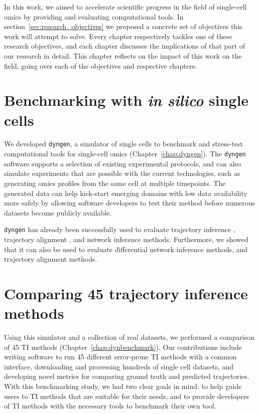 

In this work, we aimed to accelerate scientific progress in the field of single-cell omics by providing and evaluating computational tools. In section~\ref{sec:research_objectives} we proposed a concrete set of objectives this work will attempt to solve. Every chapter respectively tackles one of these research objectives, and each chapter discusses the implications of that part of our research in detail. This chapter reflects on the impact of this work on the field, going over each of the objectives and respective chapters. 

\section{Benchmarking with \textit{in silico} single cells}

We developed \texttt{dyngen}, a simulator of single cells to benchmark and stress-test computational tools for single-cell omics (Chapter~\ref{chap:dyngen}).
The \texttt{dyngen} software supports a selection of existing experimental protocols, and can also simulate experiments that are possible with the current technologies, such as generating omics profiles from the same cell at multiple timepoints.
The generated data can help kick-start emerging domains with low data availability more safely by allowing software developers to test their method before numerous datasets become publicly available.

\texttt{dyngen} has already been successfully used to evaluate trajectory inference \cite{saelens_comparisonsinglecelltrajectory_2019}, trajectory alignment \cite{vandenberge_trajectorybaseddifferentialexpression_2019}, and network inference \cite{pratapa_benchmarkingalgorithmsgene_2019} methods. Furthermore, we showed that it can also be used to evaluate differential network inference methods, and trajectory alignment methods.




\section{Comparing 45 trajectory inference methods}
Using this simulator and a collection of real datasets, we performed a comparison of 45 TI methods (Chapter~\ref{chap:dynbenchmark}).
Our contributions include writing software to run 45 different error-prone TI methods with a common interface, downloading and processing hundreds of single cell datasets, and developing novel metrics for comparing ground truth and predicted trajectories.
With this benchmarking study, we had two clear goals in mind: to help guide users to TI methods that are suitable for their needs, and to provide developers of TI methods with the necessary tools to benchmark their own tool.

